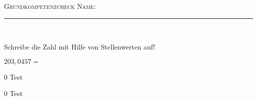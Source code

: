 \documentclass[a4paper,12pt]{report}
\begin{document}
\textsc{Grundkompetenzcheck} \hfill \textsc{Name:} \rule{8cm}{0.4pt} \normalsize \\ \vspace{\baselineskip} 

\begin{beispiel}{0}
				Schreibe die Zahl mit Hilfe von Stellenwerten auf!\leer
					
					$203,0457=$ 

\end{beispiel}

\begin{langesbeispiel} \item[0]
Test

\end{langesbeispiel}

\begin{langesbeispiel} \item[0]
Test

\end{langesbeispiel}
\end{document}
